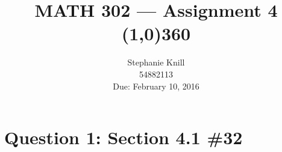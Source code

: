 \documentclass[11pt, oneside]{article}   	%
\begin{document}
\title{MATH 302 --- Assignment 4 \\
\line(1,0){360} \\              %
}
\author{
Stephanie Knill \\
54882113 \\
Due: February 10, 2016}

\date{}                   %
\maketitle




\section*{Question 1: Section 4.1 \#32}
\end{document}
